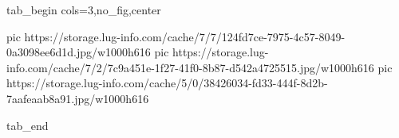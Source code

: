  
 
 
 
 


\ifcmt
  tab_begin cols=3,no_fig,center

     pic https://storage.lug-info.com/cache/7/7/124fd7ce-7975-4c57-8049-0a3098ee6d1d.jpg/w1000h616%
     pic https://storage.lug-info.com/cache/7/2/7c9a451e-1f27-41f0-8b87-d542a4725515.jpg/w1000h616%
     pic https://storage.lug-info.com/cache/5/0/38426034-fd33-444f-8d2b-7aafeaab8a91.jpg/w1000h616%

  tab_end
\fi
